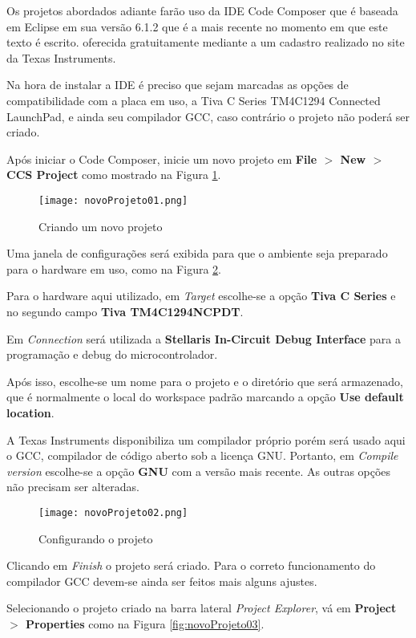 Os projetos abordados adiante farão uso da IDE Code Composer que é baseada em Eclipse em sua versão 6.1.2 que é a mais recente no momento em que este texto é escrito. oferecida gratuitamente mediante a um cadastro realizado no site da Texas Instruments.

Na hora de instalar a IDE é preciso que sejam marcadas as opções de compatibilidade com a placa em uso, a Tiva C Series TM4C1294 Connected LaunchPad, e ainda seu compilador GCC, caso contrário o projeto não poderá ser criado.

Após iniciar o Code Composer, inicie um novo projeto em \textbf{File $>$ New $>$ CCS Project} como mostrado na Figura \ref{fig:novoProjeto01}.

\begin{figure}[H]
	\centering
	\texttt{[image: novoProjeto01.png]}
	\caption{Criando um novo projeto}
	\label{fig:novoProjeto01}
\end{figure}

Uma janela de configurações será exibida para que o ambiente seja preparado 
para o hardware em uso, como na Figura \ref{fig:novoProjeto02}.

Para o hardware aqui utilizado, em \emph{Target} escolhe-se a opção 
\textbf{Tiva C Series} e no segundo campo \textbf{Tiva TM4C1294NCPDT}.

Em \emph{Connection} será utilizada a \textbf{Stellaris In-Circuit 
Debug Interface} para a programação e debug do microcontrolador.

Após isso, escolhe-se um nome para o projeto e o diretório que será armazenado, 
que é normalmente o local do workspace padrão marcando a opção \textbf{Use 
default location}.

A Texas Instruments disponibiliza um compilador próprio porém será usado aqui o 
GCC, compilador de código aberto sob a licença GNU. Portanto, em \emph{Compile 
version} escolhe-se a opção \textbf{GNU} com a versão mais recente.
As outras opções não precisam ser alteradas.

\begin{figure}[H]
	\centering
	\texttt{[image: novoProjeto02.png]}
	\caption{Configurando o projeto}
	\label{fig:novoProjeto02}
\end{figure}

Clicando em \emph{Finish} o projeto será criado. Para o correto funcionamento 
do compilador GCC devem-se ainda ser feitos mais alguns ajustes.

Selecionando o projeto criado na barra lateral \emph{Project Explorer}, vá em 
\textbf{Project $>$ Properties} como na Figura \ref{fig:novoProjeto03}.

